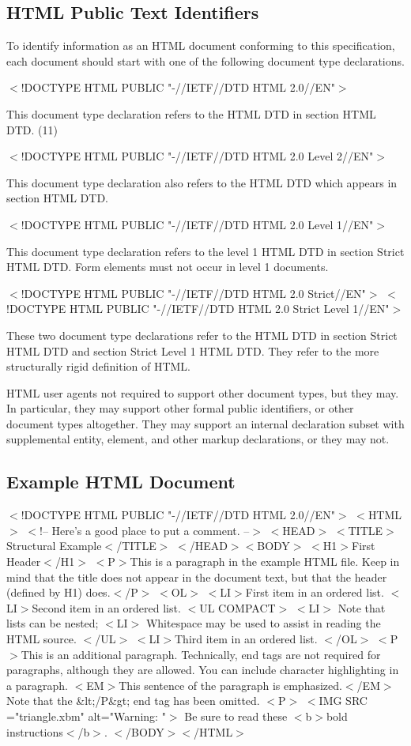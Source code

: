 \subsection*{HTML Public Text Identifiers}\par 
To identify information as an HTML document conforming to this
specification, each document should start with one of the following
document type declarations.
\par $<$!DOCTYPE HTML PUBLIC "-//IETF//DTD HTML 2.0//EN"$>$
\par 
This document type declaration refers to the HTML DTD in section HTML DTD.
(11)\par $<$!DOCTYPE HTML PUBLIC "-//IETF//DTD HTML 2.0 Level 2//EN"$>$
\par 
This document type declaration also refers to the HTML DTD which
appears in section HTML DTD.
\par $<$!DOCTYPE HTML PUBLIC "-//IETF//DTD HTML 2.0 Level 1//EN"$>$
\par 
This document type declaration refers to the level 1 HTML DTD in
section Strict HTML DTD.  Form elements must not occur in level 1
documents.
\par $<$!DOCTYPE HTML PUBLIC "-//IETF//DTD HTML 2.0 Strict//EN"$>$
$<$!DOCTYPE HTML PUBLIC "-//IETF//DTD HTML 2.0 Strict Level 1//EN"$>$
\par 
These two document type declarations refer to the HTML DTD in section Strict HTML DTD and section Strict Level 1 HTML DTD.  They refer to the more
structurally rigid definition of HTML.
\par \par 
HTML user agents not required to support other document types, but
they may.  In particular, they may support other formal public
identifiers, or other document types altogether.  They may support
an internal declaration subset with supplemental entity,
element, and other markup declarations, or they may not.
\par \subsection*{Example HTML Document}$<$!DOCTYPE HTML PUBLIC "-//IETF//DTD HTML 2.0//EN"$>$
$<$HTML$>$
$<$!-- Here's a good place to put a comment. --$>$
$<$HEAD$>$
$<$TITLE$>$Structural Example$<$/TITLE$>$
$<$/HEAD$>$$<$BODY$>$
$<$H1$>$First Header$<$/H1$>$
$<$P$>$This is a paragraph in the example HTML file. Keep in mind 
that the title does not appear in the document text, but that 
the header (defined by H1) does.$<$/P$>$
$<$OL$>$
$<$LI$>$First item in an ordered list.
$<$LI$>$Second item in an ordered list.
  $<$UL COMPACT$>$
  $<$LI$>$ Note that lists can be nested;
  $<$LI$>$ Whitespace may be used to assist in reading the 
       HTML source.
  $<$/UL$>$
$<$LI$>$Third item in an ordered list.
$<$/OL$>$
$<$P$>$This is an additional paragraph. Technically, end tags are 
not required for paragraphs, although they are allowed. You can 
include character highlighting in a paragraph. $<$EM$>$This sentence 
of the paragraph is emphasized.$<$/EM$>$ Note that the \&lt;/P\&gt; 
end tag has been omitted.
$<$P$>$
$<$IMG SRC ="triangle.xbm" alt="Warning: "$>$
Be sure to read these $<$b$>$bold instructions$<$/b$>$.
$<$/BODY$>$$<$/HTML$>$
